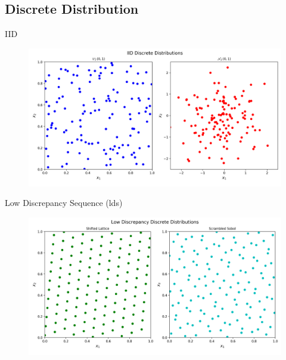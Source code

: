 \documentclass[11pt]{beamer}
\begin{document}
\subsection{Discrete Distribution}
\begin{frame}{IID}
    
    \begin{figure}[ht!]
        \centering
        \includegraphics[width=1\textwidth]
            {Figs/iid_dd.png}
        \label{fig:iid_dd}
    \end{figure}
\end{frame}
\begin{frame}{Low Discrepancy Sequence (lds)}
    \begin{figure}[ht!]
        \centering
        \includegraphics[width=1\textwidth]
            {Figs/lds_dd.png}
        \label{fig:lds_dd}
    \end{figure}
\end{frame}

\end{document}
